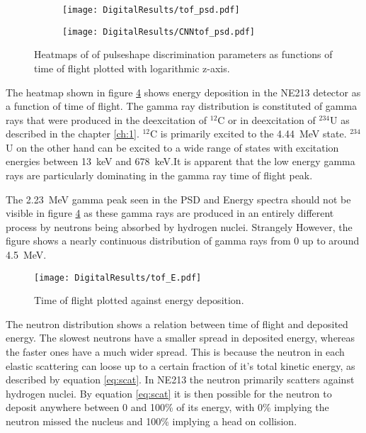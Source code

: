 \documentclass[main.tex]{subfiles}
\begin{document}
\begin{figure}
    \centering
    \begin{subfigure}[ht]{\textwidth}
        \texttt{[image: DigitalResults/tof\_psd.pdf]}
        \caption{}
        \label{fig:tof_digi_cc}
    \end{subfigure}
	\begin{subfigure}[ht]{\textwidth}
        \texttt{[image: DigitalResults/CNNtof\_psd.pdf]}
        \caption{}
        \label{fig:tof_digi_cnn}
    \end{subfigure}
    \caption[Pulse shape parameters as function of time of flight, digital setup.]{Heatmaps of of pulseshape discrimination parameters as functions of time of flight plotted with logarithmic z-axis.}
    \label{fig:tof_cc_tof_cnn}
\end{figure}

The heatmap shown in figure \ref{fig:tof_E_d} shows energy deposition in the NE213 detector as a function of time of flight. The gamma ray distribution is constituted of gamma rays that were produced in the deexcitation of $^\mathrm{12}$C or in deexcitation of $^\mathrm{234}$U as described in the chapter \ref{ch:1}. $^\mathrm{12}$C is primarily excited to the \SI{4.44}{\MeV} state. $^\mathrm{234}$U on the other hand can be excited to a wide range of states with excitation energies between \SI{13}{keV} and \SI{678}{keV}\cite{Nudat}.It is apparent that the low energy gamma rays are particularly dominating in the gamma ray time of flight peak.

The \SI{2.23}{MeV} gamma peak seen in the PSD and Energy spectra should not be visible in figure \ref{fig:tof_E_d} as these gamma rays are produced in an entirely different process by neutrons being absorbed by hydrogen nuclei. Strangely However, the figure shows a nearly continuous distribution of gamma rays from 0 up to around \SI{4.5}{MeV}.

\begin{figure}[ht]
    \centering
        \texttt{[image: DigitalResults/tof\_E.pdf]}
        \caption[Time of flight plotted against energy deposition.]{Time of flight plotted against energy deposition.}
    \label{fig:tof_E_d} 
\end{figure}

The neutron distribution shows a relation between time of flight and deposited energy. The slowest neutrons have a smaller spread in deposited energy, whereas the faster ones have a much wider spread. This is because the neutron in each elastic scattering can loose up to a certain fraction of it's total kinetic energy, as described by equation \ref{eq:scat}. In NE213 the neutron primarily scatters against hydrogen nuclei. By equation \ref{eq:scat} it is then possible for the neutron to deposit anywhere between 0 and 100\% of its energy, with 0\% implying the neutron missed the nucleus and 100\% implying a head on collision.
\end{document}
